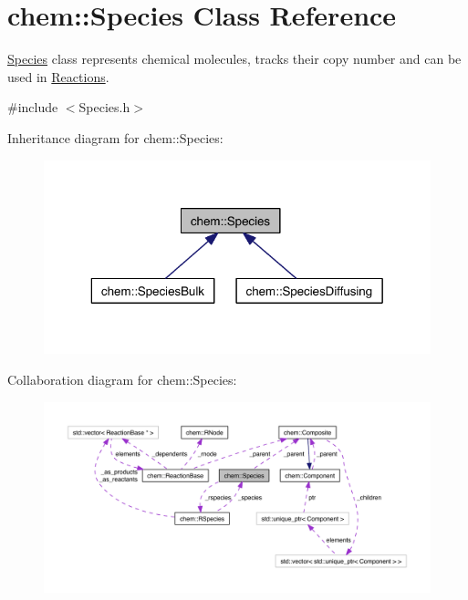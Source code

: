 \hypertarget{classchem_1_1Species}{\section{chem\-:\-:Species Class Reference}
\label{classchem_1_1Species}
}


\hyperlink{classchem_1_1Species}{Species} class represents chemical molecules, tracks their copy number and can be used in \hyperlink{classchem_1_1Reaction}{Reactions}.  




{\ttfamily \#include $<$Species.\-h$>$}



Inheritance diagram for chem\-:\-:Species\-:\nopagebreak
\begin{figure}[H]
\begin{center}
\leavevmode
\includegraphics[width=319pt]{classchem_1_1Species__inherit__graph}
\end{center}
\end{figure}


Collaboration diagram for chem\-:\-:Species\-:\nopagebreak
\begin{figure}[H]
\begin{center}
\leavevmode
\includegraphics[width=350pt]{classchem_1_1Species__coll__graph}
\end{center}
\end{figure}
